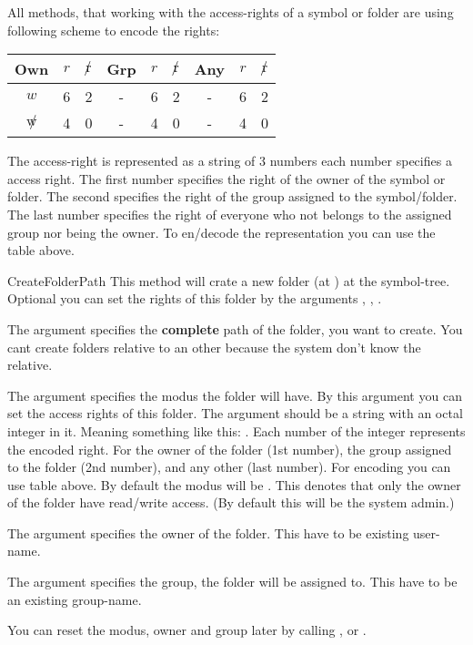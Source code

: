 All methods, that working with the access-rights of a symbol or folder
are using following scheme to encode the rights:

\begin{center}
\begin{tabular}{|c|cc||c|cc||c|cc|} \hline\hline
\bf{Own} & $r$&$\not r$&\bf{Grp}&$r$ & $\not r$ & \bf{Any} & $r$ & $\not r$\\\hline
$w$ & 6 & 2 & - & 6 & 2 & - & 6 & 2 \\
$\not w$ & 4 & 0 & - & 4 & 0 & - & 4 & 0 \\\hline\hline
\end{tabular}
\end{center}
The access-right is represented as a string of 3 numbers each number specifies 
a access right. The first number specifies the right of the owner of the 
symbol or folder. The second specifies the right of the group assigned to the 
symbol/folder.  The last number specifies the right of everyone who not 
belongs to the assigned group nor being the owner. To en/decode the 
representation you can use the table above.


\begin{methoddesc}[System]{CreateFolder}{Path}
This method will crate a new folder (at ) at the symbol-tree. 
Optional you can set the rights of this folder by the arguments , 
, . 

The argument  specifies the \textbf{complete} path of the folder, 
you want to create. You cant create folders relative to an other because the 
system don't know the relative.

The argument  specifies the modus the folder will have. By this 
argument you can set the access rights of this folder. The argument should be
a string with an octal integer in it. Meaning something like this: .
Each number of the integer represents the encoded right. For the owner of the
folder (1st number), the group assigned to the folder (2nd number), and any other
(last number). For encoding you can use table above. 
By default the modus will be . This denotes that only the owner 
of the folder have read/write access. (By default this will be the system admin.)

The argument  specifies the owner of the folder. This have to be 
existing user-name. 

The argument  specifies the group, the folder will be assigned to. 
This have to be an existing group-name.

\begin{notice}
You can reset the modus, owner and group later by calling 
,  or .
\end{notice}
\end{methoddesc}


